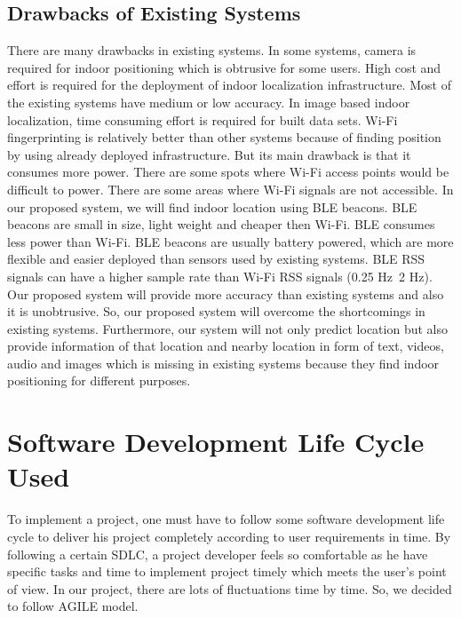 \documentclass{article}
\begin{document}
\subsection{Drawbacks of Existing Systems}
There are many drawbacks in existing systems. In some systems, camera is required for indoor positioning which is obtrusive for some users. High cost and effort is required for the deployment of indoor localization infrastructure. Most of the existing systems have medium or low accuracy. In image based indoor localization, time consuming effort is required for built data sets. Wi-Fi fingerprinting is relatively better than other systems because of finding position by using already deployed infrastructure. But its main drawback is that it consumes more power. There are some spots where Wi-Fi access points would be difficult to power. There are some areas where Wi-Fi signals are not accessible. In our proposed system, we will find indoor location using BLE beacons. BLE beacons are small in size, light weight and cheaper then Wi-Fi. BLE consumes less power than Wi-Fi. BLE beacons are usually battery powered, which are more flexible and easier deployed than sensors used by existing systems. BLE RSS signals can have a higher sample rate than Wi-Fi RSS signals (0.25 Hz~2 Hz). Our proposed system will provide more accuracy than existing systems and also it is unobtrusive. So, our proposed system will overcome the shortcomings in existing systems. Furthermore, our system will not only predict location but also provide information of that location and nearby location in form of text, videos, audio and images which is missing in existing systems because they find indoor positioning for different purposes\cite{zhuang2016smartphone}.
\section{Software Development Life Cycle Used}
To implement a project, one must have to follow some software development life cycle to deliver his project completely according to user requirements in time. By following a certain SDLC, a project developer feels so comfortable as he have specific tasks and time to implement project timely  which meets the user’s point of view. In our project, there are lots of fluctuations time by time. So, we decided to follow AGILE model.
\end{document}
